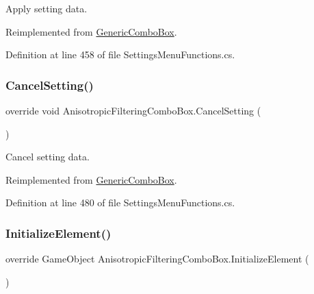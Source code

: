 Apply setting data. 



Reimplemented from \hyperlink{class_generic_combo_box_a5aced71f035bd463a4ebaaffe19ec547}{Generic\+Combo\+Box}.



Definition at line 458 of file Settings\+Menu\+Functions.\+cs.

\mbox{\label{class_anisotropic_filtering_combo_box_ae2c2cdc46f898319f43eff20acd32b6f}} 
\subsubsection{\texorpdfstring{Cancel\+Setting()}{CancelSetting()}}
{\footnotesize\ttfamily override void Anisotropic\+Filtering\+Combo\+Box.\+Cancel\+Setting (\begin{DoxyParamCaption}{ }\end{DoxyParamCaption})\hspace{0.3cm}{\ttfamily [virtual]}}



Cancel setting data. 



Reimplemented from \hyperlink{class_generic_combo_box_a0949a84cf1e33d13346cb90597e005ce}{Generic\+Combo\+Box}.



Definition at line 480 of file Settings\+Menu\+Functions.\+cs.

\mbox{\label{class_anisotropic_filtering_combo_box_a3a3182ef43ee5c56158e41c750329ab5}} 
\subsubsection{\texorpdfstring{Initialize\+Element()}{InitializeElement()}}
{\footnotesize\ttfamily override Game\+Object Anisotropic\+Filtering\+Combo\+Box.\+Initialize\+Element (\begin{DoxyParamCaption}{ }\end{DoxyParamCaption})\hspace{0.3cm}{\ttfamily [virtual]}}



